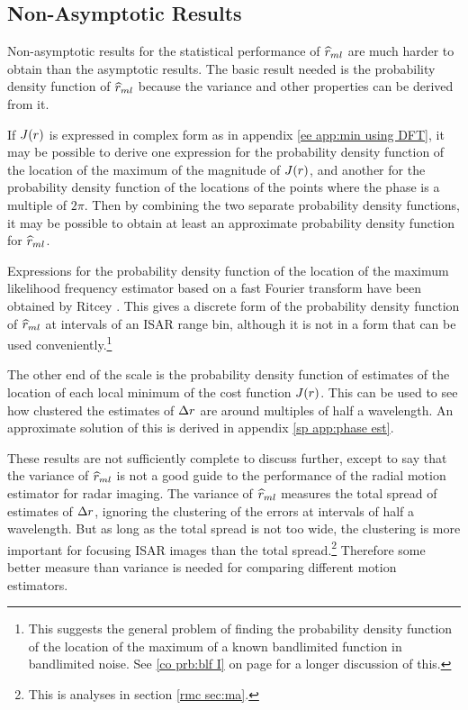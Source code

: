\subsection{Non-Asymptotic Results}

Non-asymptotic results for the statistical performance of $\widehat{r}_{ml}$
are much harder to obtain than the asymptotic results.  The basic result
needed is the probability density function of $\widehat{r}_{ml}$ because the variance
and other properties can be derived from it.

If $J({r})$ is expressed in complex form as in appendix \ref{ee app:min
using DFT}, it may be possible to derive one expression for the probability
density function of the location of the maximum of the magnitude of
$J({r})$, and another for the probability density function of the locations
of the points where the phase is a multiple of $2\pi$.  Then by combining
the two separate probability density functions, it may be possible to
obtain at least an approximate probability density function for $\widehat{r}_{ml}$.

Expressions for the probability density function of the location of the
maximum likelihood frequency estimator based on a fast Fourier transform
have been obtained by Ritcey \cite{Rit87}.  This gives a discrete form of
the probability density function of $\widehat{r}_{ml}$ at intervals of an ISAR range
bin, although it is not in a form that can be used
conveniently.\footnote{This suggests the general problem of finding the
probability density function of the location of the maximum of a known
bandlimited function in bandlimited noise.  See \protect\ref{co prb:blf I}
on page \protect\pageref{co prb:blf I} for a longer discussion of this.}

The other end of the scale is the probability density function of estimates
of the location of each local minimum of the cost function $J({r})$.  This
can be used to see how clustered the estimates of ${\Delta r}$ are around
multiples of half a wavelength.  An approximate solution of this is derived
in appendix \ref{sp app:phase est}.

These results are not sufficiently complete to discuss further, except to
say that the variance of $\widehat{r}_{ml}$ is not a good guide to the performance of
the radial motion estimator for radar imaging.  The variance of $\widehat{r}_{ml}$
measures the total spread of estimates of ${\Delta r}$, ignoring the clustering of
the errors at intervals of half a wavelength.  But as long as the total
spread is not too wide, the clustering is more important for focusing
ISAR images than the total spread.\footnote{This is analyses in section
\protect\ref{rmc sec:ma}.}  Therefore some better measure than
variance is needed for comparing different motion estimators.

